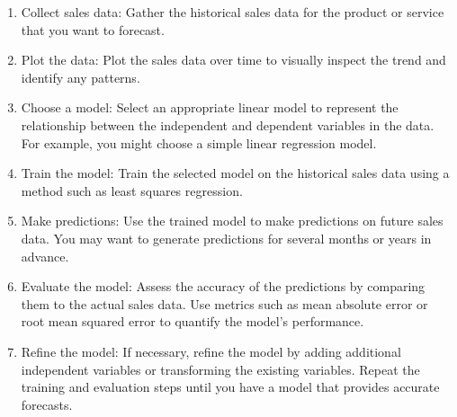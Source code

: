 \begin{enumerate}
    \item Collect sales data: Gather the historical sales data for the product or service that you want to forecast.
    \item Plot the data: Plot the sales data over time to visually inspect the trend and identify any patterns.
    \item Choose a model: Select an appropriate linear model to represent the relationship between the independent and dependent variables in the data.
    For example, you might choose a simple linear regression model.
    \item Train the model: Train the selected model on the historical sales data using a method such as least squares regression.
    \item Make predictions: Use the trained model to make predictions on future sales data. You may want to generate predictions for several
    months or years in advance.
    \item Evaluate the model: Assess the accuracy of the predictions by comparing them to the actual sales data. Use metrics such as mean absolute
    error or root mean squared error to quantify the model's performance.
    \item Refine the model: If necessary, refine the model by adding additional independent variables or transforming the existing variables.
    Repeat the training and evaluation steps until you have a model that provides accurate forecasts.
\end{enumerate}

